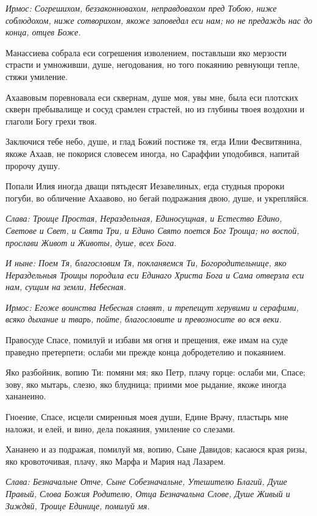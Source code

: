
\itshape Ирмос\normalfont{}: Согрешихом, беззаконновахом, неправдовахом пред Тобою, ниже соблюдохом, ниже сотворихом, якоже заповедал еси нам; но не предаждь нас до конца, отцев Боже. 

Манассиева собрала еси согрешения изволением, поставльши яко мерзости страсти и умноживши, душе, негодования, но того покаянию ревнующи тепле, стяжи умиление. 

Ахаавовым поревновала еси сквернам, душе моя, увы мне, была еси плотских скверн пребывалище и сосуд срамлен страстей, но из глубины твоея воздохни и глаголи Богу грехи твоя. 

Заключися тебе небо, душе, и глад Божий постиже тя, егда Илии Фесвитянина, якоже Ахаав, не покорися словесем иногда, но Сараффии уподобився, напитай пророчу душу. 

Попали Илия иногда дващи пятьдесят Иезавелиных, егда студныя пророки погуби, во обличение Ахаавово, но бегай подражания двою, душе, и укрепляйся. 

\itshape Слава\normalfont{}: Троице Простая, Нераздельная, Единосущная, и Естество Едино, Светове и Свет, и Свята Три, и Едино Свято поется Бог Троица; но воспой, прослави Живот и Животы, душе, всех Бога. 

\itshape И ныне\normalfont{}: Поем Тя, благословим Тя, покланяемся Ти, Богородительнице, яко Нераздельныя Троицы породила еси Единаго Христа Бога и Сама отверзла еси нам, сущим на земли, Небесная. 


\itshape Ирмос\normalfont{}: Егоже воинства Небесная славят, и трепещут херувими и серафими, всяко дыхание и тварь, пойте, благословите и превозносите во вся веки. 

Правосуде Спасе, помилуй и избави мя огня и прещения, еже имам на суде праведно претерпети; ослаби ми прежде конца добродетелию и покаянием. 

Яко разбойник, вопию Ти: помяни мя; яко Петр, плачу горце: ослаби ми, Спасе; зову, яко мытарь, слезю, яко блудница; приими мое рыдание, якоже иногда хананеино. 

Гноение, Спасе, исцели смиренныя моея души, Едине Врачу, пластырь мне наложи, и елей, и вино, дела покаяния, умиление со слезами. 

Хананею и аз подражая, помилуй мя, вопию, Сыне Давидов; касаюся края ризы, яко кровоточивая, плачу, яко Марфа и Мария над Лазарем. 

\itshape Слава\normalfont{}: Безначальне Отче, Сыне Собезначальне, Утешителю Благий, Душе Правый, Слова Божия Родителю, Отца Безначальна Слове, Душе Живый и Зиждяй, Троице Единице, помилуй мя. 

